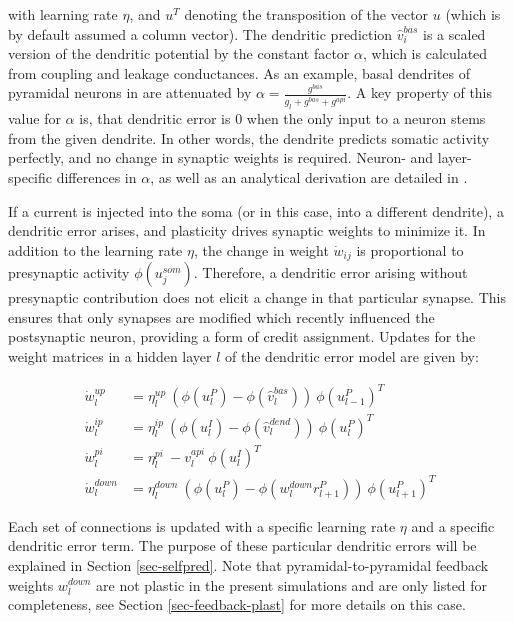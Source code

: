 with learning rate $\eta$, and $u^T$ denoting the transposition of the vector $u$ (which is by default assumed a column
vector). The dendritic prediction $\hat{v}_i^{bas}$ is a scaled version of the dendritic potential by the constant
factor $\alpha$, which is calculated from coupling and leakage conductances. As an example, basal dendrites of pyramidal
neurons in \citep{sacramento2018dendritic} are attenuated by $\alpha = \frac{g^{bas}}{g_l + g^{bas} + g^{api}}$. A key
property of this value for $\alpha$ is, that dendritic error is $0$ when the only input to a neuron stems from the given
dendrite. In other words, the dendrite predicts somatic activity perfectly, and no change in synaptic weights is
required. Neuron- and layer-specific differences in $\alpha$, as well as an analytical derivation are detailed in
\citep{sacramento2018dendritic}.

If a current is injected into the soma (or in this case, into a different dendrite), a dendritic error arises, and
plasticity drives synaptic weights to minimize it. In addition to the learning rate $\eta$, the change in weight
$\dot{w}_{ij}$ is proportional to presynaptic activity $\phi(u_j^{som})$. Therefore, a dendritic error arising without
presynaptic contribution does not elicit a change in that particular synapse. This ensures that only synapses are
modified which recently influenced the postsynaptic neuron, providing a form of credit assignment. Updates for the
weight matrices in a hidden layer $l$ of the dendritic error model are given by:

\begin{align}
  \dot{w}_{l}^{up}   & = \eta_l^{up} \ ( \phi(u_l^{P}) - \phi(\hat{v}_l^{bas}) ) \ \phi(u_{l-1}^{P})^T\label{eq-delta_w_up}         \\
  \dot{w}_{l}^{ip}   & = \eta_l^{ip} \ ( \phi(u_l^{I}) - \phi(\hat{v}_l^{dend}) ) \ \phi(u_{l}^{P})^T\label{eq-delta_w_ip}          \\
  \dot{w}_{l}^{pi}   & = \eta_l^{pi} \ - v_l^{api} \ \phi(u_l^{I})^T\label{eq-delta_w_pi}                                           \\
  \dot{w}_{l}^{down} & = \eta_l^{down} \ ( \phi(u_l^{P}) - \phi(w_l^{down} r_{l+1}^P) )\ \phi(u_{l+1}^{P})^T\label{eq-delta_w_down}
\end{align}

Each set of connections is updated with a specific learning rate $\eta$ and a specific dendritic error term. The purpose
of these particular dendritic errors will be explained in Section \ref{sec-selfpred}. Note that pyramidal-to-pyramidal
feedback weights $w_l^{down}$ are not plastic in the present simulations and are only listed for completeness, see
Section \ref{sec-feedback-plast} for more details on this case.

